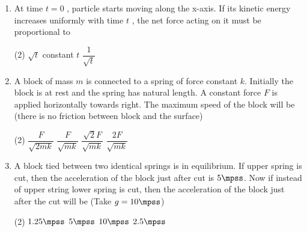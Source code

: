 \documentclass{article}
\begin{document}
\begin{enumerate}
\item At time $t = 0$ , particle starts moving along the
x-axis. If its kinetic energy increases uniformly with time $t$ , the net force acting on it must be proportional to
\begin{tasks}(2)
	\task $\sqrt{t}$
	\task constant
	\task $t$
	\task $\dfrac{1}{\sqrt{t}}$\ans
\end{tasks}

\item A block of mass $m$ is connected to a spring of force constant $k$. Initially the block is at rest and the spring has natural length. A constant force $F$ is applied horizontally towards right. The maximum speed of the block will be (there is no friction between block and the surface)
\begin{center}
\end{center}
\begin{tasks}(2)
	\task $\dfrac{F}{\sqrt{2mk}}$
	\task $\dfrac{F}{\sqrt{mk}}$\ans
	\task $\dfrac{\sqrt{2}F}{\sqrt{mk}}$
	\task $\dfrac{2F}{\sqrt{mk}}$
\end{tasks}

\item A block tied between two identical springs is in equilibrium. If upper spring is cut, then
the acceleration of the block just after cut is $5 \mpss$. Now if instead of upper string lower spring is cut, then the acceleration of the block just after the cut will be
(Take $g = 10 \mpss$)
\begin{center}
\end{center}
\begin{tasks}(2)
	\task $1.25\mpss$
	\task $5\mpss$\ans
	\task $10\mpss$
	\task $2.5\mpss$
\end{tasks}




\end{enumerate}
\end{document}
